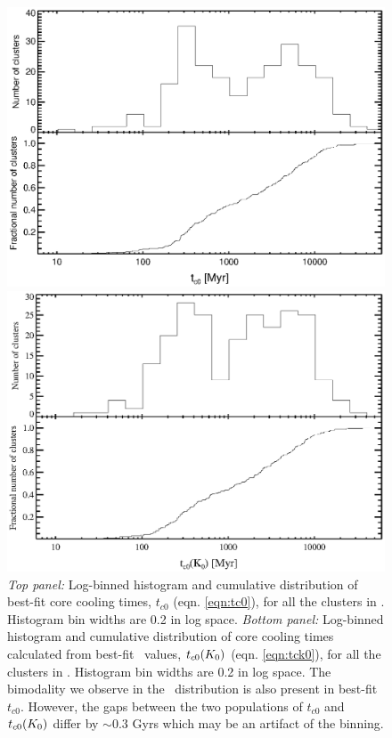 \begin{figure}[htp]
  \begin{center}
    \begin{minipage}[htp]{0.8\linewidth}
      \includegraphics*[width=\textwidth, trim=20mm 10mm 10mm 10mm, clip]{t0.eps}
    \end{minipage}
    \begin{minipage}[htp]{0.8\linewidth}
      \includegraphics*[width=\textwidth, trim=20mm 10mm 10mm 10mm, clip]{k0cool.eps}
    \end{minipage}
    \caption{{\it{Top panel:}} Log-binned histogram and cumulative
      distribution of best-fit core cooling times, $t_{c0}$
      (eqn. \ref{eqn:tc0}), for all the clusters in \accept. Histogram
      bin widths are 0.2 in log space. {\it{Bottom panel:}} Log-binned
      histogram and cumulative distribution of core cooling times
      calculated from best-fit \kna\ values, $t_{c0}(K_0)$
      (eqn. \ref{eqn:tck0}), for all the clusters in
      \accept. Histogram bin widths are 0.2 in log space. The
      bimodality we observe in the \kna\ distribution is also present
      in best-fit $t_{c0}$. However, the gaps between the two
      populations of $t_{c0}$ and $t_{c0}(K_0)$ differ by $\sim 0.3$
      Gyrs which may be an artifact of the binning.}
    \label{fig:t0}
  \end{center}
\end{figure}

